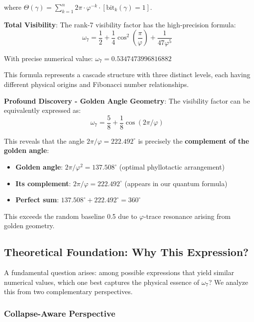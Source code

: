\documentclass[%
 reprint,
 amsmath,amssymb,
 aps,
 prd,
 10pt,
 nofootinbib,      %
 longbibliography  %
]{revtex4-2}
\theoremstyle{definition}
\theoremstyle{remark}
\begin{document}
where $\Theta(\gamma) = \sum_{k=1}^n 2\pi \cdot \varphi^{-k} \cdot [\text{bit}_k(\gamma) = 1]$.

\textbf{Total Visibility}: The rank-7 visibility factor has the high-precision formula:
\begin{equation}
\boxed{\omega_7 = \frac{1}{2} + \frac{1}{4}\cos^2\left(\frac{\pi}{\varphi}\right) + \frac{1}{47\varphi^5}}
\end{equation}

With precise numerical value: $\omega_7 = 0.5347473996816882$

This formula represents a cascade structure with three distinct levels, each having different physical origins and Fibonacci number relationships.

\textbf{Profound Discovery - Golden Angle Geometry}: The visibility factor can be equivalently expressed as:
\begin{equation}
\omega_7 = \frac{5}{8} + \frac{1}{8}\cos(2\pi/\varphi)
\end{equation}

This reveals that the angle $2\pi/\varphi = 222.492^\circ$ is precisely the \textbf{complement of the golden angle}:
\begin{itemize}
\item \textbf{Golden angle}: $2\pi/\varphi^2 = 137.508^\circ$ (optimal phyllotactic arrangement)
\item \textbf{Its complement}: $2\pi/\varphi = 222.492^\circ$ (appears in our quantum formula)
\item \textbf{Perfect sum}: $137.508^\circ + 222.492^\circ = 360^\circ$
\end{itemize}

This exceeds the random baseline 0.5 due to $\varphi$-trace resonance arising from golden geometry.

\subsection{Theoretical Foundation: Why This Expression?}

A fundamental question arises: among possible expressions that yield similar numerical values, which one best captures the physical essence of $\omega_7$? We analyze this from two complementary perspectives.

\subsubsection{Collapse-Aware Perspective}
\end{document}
